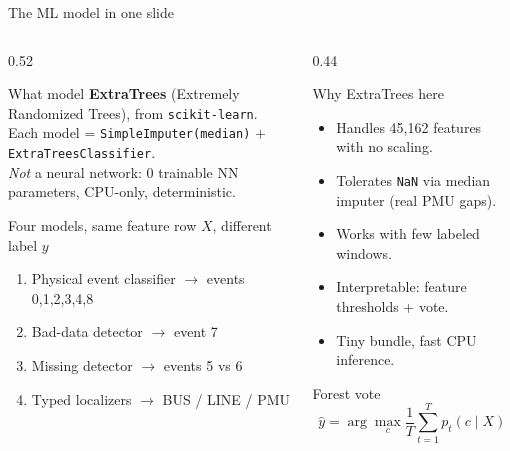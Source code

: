 ﻿\documentclass[10pt,aspectratio=169]{beamer}
\newcommand{\code}[1]{\texttt{\footnotesize #1}}
\begin{document}
\begin{frame}{The ML model in one slide}
\small
\vspace{-1.5mm}
\begin{columns}[T,totalwidth=\textwidth]
\begin{column}{0.52\textwidth}
\begin{block}{What model}
\textbf{ExtraTrees} (Extremely Randomized Trees), from \code{scikit-learn}.\\[0.3mm]
Each model = \code{SimpleImputer(median)} $+$ \code{ExtraTreesClassifier}.\\[0.3mm]
\emph{Not} a neural network: 0 trainable NN parameters, CPU-only, deterministic.
\end{block}
\begin{exampleblock}{Four models, same feature row $X$, different label $y$}
\begin{enumerate}
  \item Physical event classifier $\rightarrow$ events 0,1,2,3,4,8
  \item Bad-data detector $\rightarrow$ event 7
  \item Missing detector $\rightarrow$ events 5 vs 6
  \item Typed localizers $\rightarrow$ BUS / LINE / PMU
\end{enumerate}
\end{exampleblock}
\end{column}
\begin{column}{0.44\textwidth}
\begin{alertblock}{Why ExtraTrees here}
\begin{itemize}
  \item Handles 45{,}162 features with no scaling.
  \item Tolerates \code{NaN} via median imputer (real PMU gaps).
  \item Works with few labeled windows.
  \item Interpretable: feature thresholds + vote.
  \item Tiny bundle, fast CPU inference.
\end{itemize}
\end{alertblock}
\begin{block}{Forest vote}
\[
\hat{y}=\arg\max_{c}\frac{1}{T}\sum_{t=1}^{T}p_t(c\mid X)
\]
\end{block}
\end{column}
\end{columns}
\end{frame}
\end{document}
